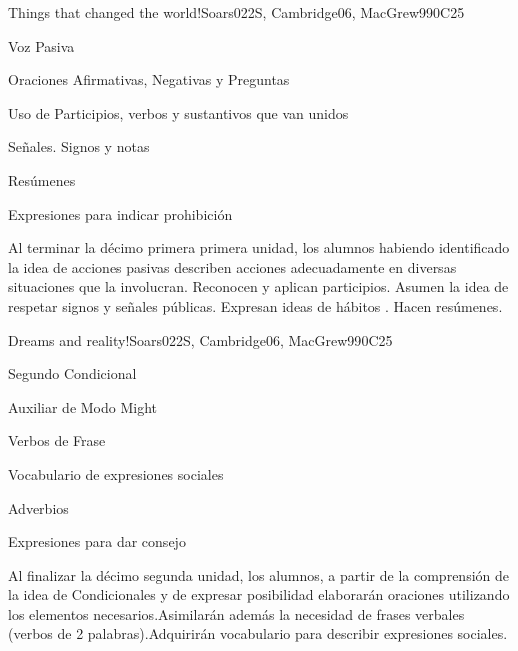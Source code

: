 \begin{syllabus}
\begin{unit}{Things that changed the world!}{}{Soars022S, Cambridge06, MacGrew99}{0}{C25}
   \begin{topics}
      \item Voz Pasiva
      \item Oraciones Afirmativas, Negativas y Preguntas
      \item Uso de Participios, verbos y sustantivos que van unidos
      \item Señales. Signos y notas
      \item Resúmenes
      \item Expresiones para indicar prohibición
   \end{topics}

   \begin{learningoutcomes}
      \item Al terminar la décimo primera primera unidad, los alumnos habiendo identificado la idea de acciones pasivas describen acciones adecuadamente en diversas situaciones que la involucran. Reconocen y aplican participios. Asumen la idea de respetar signos y señales públicas. Expresan ideas de hábitos . Hacen resúmenes.
   \end{learningoutcomes}
\end{unit}

\begin{unit}{Dreams and reality!}{}{Soars022S, Cambridge06, MacGrew99}{0}{C25}
   \begin{topics}
      \item Segundo Condicional
      \item Auxiliar de Modo Might
      \item Verbos de Frase
      \item Vocabulario de expresiones sociales
      \item Adverbios
      \item Expresiones para dar consejo
   \end{topics}

   \begin{learningoutcomes}
      \item Al finalizar la décimo segunda unidad, los alumnos, a partir de la comprensión de la idea de Condicionales y de expresar posibilidad elaborarán oraciones utilizando los elementos necesarios.Asimilarán además la necesidad de frases verbales (verbos de 2 palabras).Adquirirán vocabulario para describir expresiones sociales.
   \end{learningoutcomes}
\end{unit}


\end{syllabus}
